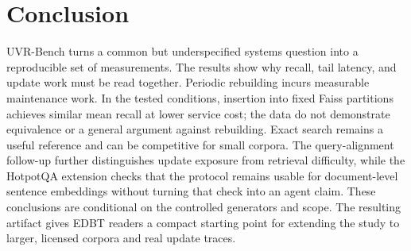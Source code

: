 \section{Conclusion}
UVR-Bench turns a common but underspecified systems question into a reproducible set of
measurements. The results show why recall, tail latency, and update work must be read
together. Periodic rebuilding incurs measurable maintenance work. In the tested conditions,
insertion into fixed Faiss partitions achieves similar mean recall at lower service
cost; the data do not demonstrate equivalence or a general argument against rebuilding.
Exact search remains a useful reference and can be competitive for small corpora.
The query-alignment follow-up further distinguishes update exposure from retrieval
difficulty, while the HotpotQA extension checks that the protocol remains usable for
document-level sentence embeddings without turning that check into an agent claim.
These conclusions are conditional on the controlled generators and scope. The resulting artifact gives EDBT readers a compact
starting point for extending the study to larger, licensed corpora and real update
traces.
